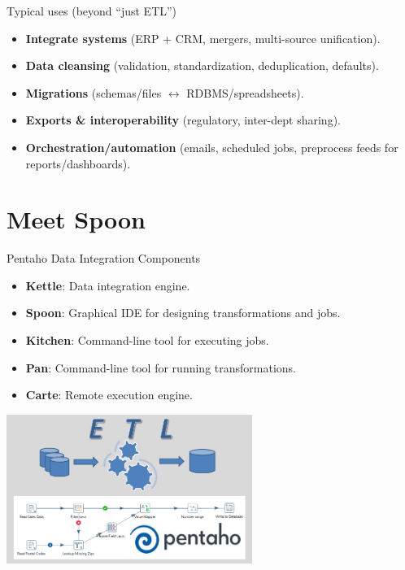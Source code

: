\documentclass[aspectratio=169]{beamer}
\begin{document}
\begin{frame}{Typical uses (beyond ``just ETL'')}
    \begin{itemize}
        \item \textbf{Integrate systems} (ERP + CRM, mergers, multi-source unification).
        \item \textbf{Data cleansing} (validation, standardization, deduplication, defaults).
        \item \textbf{Migrations} (schemas/files $\leftrightarrow$ RDBMS/spreadsheets).
        \item \textbf{Exports \& interoperability} (regulatory, inter-dept sharing).
        \item \textbf{Orchestration/automation} (emails, scheduled jobs, preprocess feeds for reports/dashboards).
    \end{itemize}
\end{frame}

\section{Meet Spoon}

\begin{frame}{Pentaho Data Integration Components}
    \begin{itemize}
        \small
        \item \textbf{Kettle}: Data integration engine.
        \item \textbf{Spoon}: Graphical IDE for designing transformations and jobs.
        \item \textbf{Kitchen}: Command-line tool for executing jobs.
        \item \textbf{Pan}: Command-line tool for running transformations.
        \item \textbf{Carte}: Remote execution engine.
    \end{itemize}
    \centering
    \includegraphics[width=0.6\textwidth]{figures/pdi_components}
\end{frame}
\end{document}
